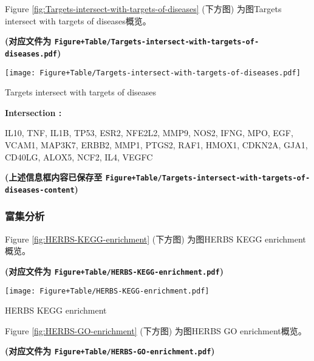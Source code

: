 \documentclass[
]{article}
\begin{document}
Figure \ref{fig:Targets-intersect-with-targets-of-diseases} (下方图) 为图Targets intersect with targets of diseases概览。

\textbf{(对应文件为 \texttt{Figure+Table/Targets-intersect-with-targets-of-diseases.pdf})}

\def\@captype{figure}
\begin{center}
\texttt{[image: Figure+Table/Targets-intersect-with-targets-of-diseases.pdf]}
\caption{Targets intersect with targets of diseases}\label{fig:Targets-intersect-with-targets-of-diseases}
\end{center}
\begin{center}\begin{tcolorbox}[colback=gray!10, colframe=gray!50, width=0.9\linewidth, arc=1mm, boxrule=0.5pt]
\textbf{
Intersection
:}

\vspace{0.5em}

    IL10, TNF, IL1B, TP53, ESR2, NFE2L2, MMP9, NOS2, IFNG,
MPO, EGF, VCAM1, MAP3K7, ERBB2, MMP1, PTGS2, RAF1, HMOX1,
CDKN2A, GJA1, CD40LG, ALOX5, NCF2, IL4, VEGFC

\vspace{2em}
\end{tcolorbox}
\end{center}

\textbf{(上述信息框内容已保存至 \texttt{Figure+Table/Targets-intersect-with-targets-of-diseases-content})}

\hypertarget{ux5bccux96c6ux5206ux6790}{%
\subsubsection{富集分析}\label{ux5bccux96c6ux5206ux6790}}

Figure \ref{fig:HERBS-KEGG-enrichment} (下方图) 为图HERBS KEGG enrichment概览。

\textbf{(对应文件为 \texttt{Figure+Table/HERBS-KEGG-enrichment.pdf})}

\def\@captype{figure}
\begin{center}
\texttt{[image: Figure+Table/HERBS-KEGG-enrichment.pdf]}
\caption{HERBS KEGG enrichment}\label{fig:HERBS-KEGG-enrichment}
\end{center}

Figure \ref{fig:HERBS-GO-enrichment} (下方图) 为图HERBS GO enrichment概览。

\textbf{(对应文件为 \texttt{Figure+Table/HERBS-GO-enrichment.pdf})}
\end{document}
